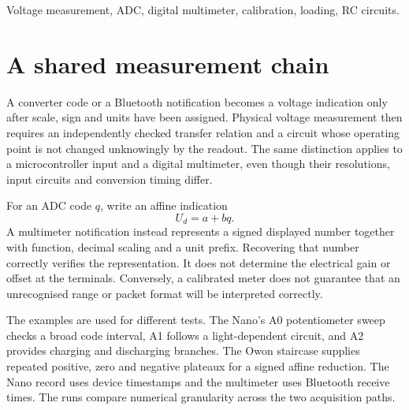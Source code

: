 \begin{abstract}
Voltage acquisition requires a numerical conversion, an electrical calibration and a defined circuit load. Microcontroller inputs and an external multimeter expose these requirements in different forms. A six-level multimeter staircase gives a gain of 1.001995 and an offset of $0.504\unit{mV}$ relative to nominal example settings; raw and displayed values agree under the defined numerical conversion. In the independent microcontroller example, capacitor charging and discharging give time constants of 0.9997 and $0.9995\unit{s}$. A common affine voltage error changes fitted amplitudes and asymptotes while preserving this timescale, whereas timebase error or loading can alter its physical interpretation. Granularity, calibration covariance and circuit dynamics must therefore be assessed at the stage where each affects the inferred quantity.
\end{abstract}
\begin{IEEEkeywords}
Voltage measurement, ADC, digital multimeter, calibration, loading, RC circuits.
\end{IEEEkeywords}

\section{A shared measurement chain}
A converter code or a Bluetooth notification becomes a voltage indication only after scale, sign and units have been assigned. Physical voltage measurement then requires an independently checked transfer relation and a circuit whose operating point is not changed unknowingly by the readout. The same distinction applies to a microcontroller input and a digital multimeter, even though their resolutions, input circuits and conversion timing differ.

For an ADC code $q$, write an affine indication
\begin{equation}
 U_d=a+bq.
 \label{eq:analog-inputs-transfer}
\end{equation}
A multimeter notification instead represents a signed displayed number together with function, decimal scaling and a unit prefix. Recovering that number correctly verifies the representation. It does not determine the electrical gain or offset at the terminals. Conversely, a calibrated meter does not guarantee that an unrecognised range or packet format will be interpreted correctly.

The examples are used for different tests. The Nano's A0 potentiometer sweep checks a broad code interval, A1 follows a light-dependent circuit, and A2 provides charging and discharging branches. The Owon staircase supplies repeated positive, zero and negative plateaux for a signed affine reduction. The Nano record uses device timestamps and the multimeter uses Bluetooth receive times. The runs compare numerical granularity across the two acquisition paths.

